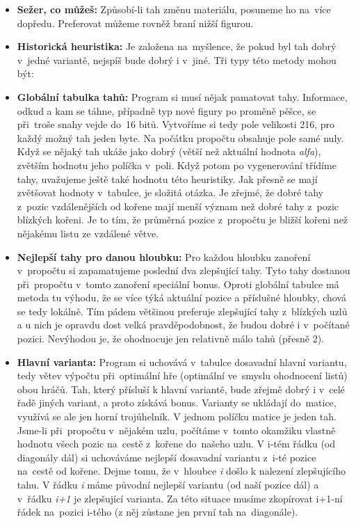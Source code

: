 \documentclass[11pt, titlepage]{article}
\begin{document}
\begin{itemize}
	\item {\bf Sežer, co můžeš:} Způsobí-li tah změnu materiálu, posuneme ho na~více dopředu. Preferovat můžeme rovněž braní nižší figurou.
	\item {\bf Historická heuristika:} Je založena na~myšlence, že pokud byl tah dobrý v~jedné variantě, nejspíš bude dobrý i v~jiné. Tři typy této metody mohou být:
	\item {\bf Globální tabulka tahů:} Program si musí nějak pamatovat tahy. Informace, odkud a kam se táhne, případně typ nové figury po proměně pěšce, se při~troše snahy vejde do~16 bitů. Vytvoříme si tedy pole velikosti 216, pro každý možný tah jeden byte. Na počátku propočtu obsahuje pole samé nuly. Když se nějaký tah ukáže jako dobrý (větší než aktuální hodnota {\it alfa}), zvětším hodnotu jeho políčka v~poli. Když potom po vygenerování třídíme tahy, uvažujeme ještě také hodnotu této heuristiky. Jak přesně se mají zvětšovat hodnoty v~tabulce, je složitá otázka. Je zřejmé, že dobré tahy z~pozic vzdálenějších od kořene mají menší význam než dobré tahy z~pozic blízkých kořeni. Je to tím, že průměrná pozice z~propočtu je bližší kořeni než nějakému listu ze vzdálené větve.
	\item {\bf Nejlepší tahy pro danou hloubku:} Pro každou hloubku zanoření v~propočtu si zapamatujeme poslední dva zlepšující tahy. Tyto tahy dostanou při~propočtu v~tomto zanoření speciální bonus. Oproti globální tabulce má metoda tu výhodu, že se více týká aktuální pozice a příslušné hloubky, chová se tedy lokálně. Tím pádem většinou preferuje zlepšující tahy z~blízkých uzlů a u nich je opravdu dost velká pravděpodobnost, že budou dobré i v~počítané pozici. Nevýhodou je, že ohodnocuje jen relativně málo tahů (přesně 2).
	\item {\bf Hlavní varianta:} Program si uchovává v~tabulce dosavadní hlavní variantu, tedy větev výpočtu při~optimální hře (optimální ve~smyslu ohodnocení listů) obou hráčů. Tah, který přísluší k hlavní variantě, bude zřejmě dobrý i v~celé řadě jiných variant, a proto získává bonus. Varianty se ukládají do~matice, využívá se ale jen horní trojúhelník. V jednom políčku matice je jeden tah. Jsme-li při~propočtu v~nějakém uzlu, počítáme v~tomto okamžiku vlastně hodnotu všech pozic na~cestě z~kořene do~našeho uzlu. V i-tém řádku (od diagonály dál) si uchováváme nejlepší dosavadní variantu z~i-té pozice na~cestě od kořene. Dejme tomu, že v~hloubce {\it i} došlo k nalezení zlepšujícího tahu. V řádku {\it i} máme původní nejlepší variantu (od naší pozice dál) a v~řádku {\it i+1} je zlepšující varianta. Za této situace musíme zkopírovat i+1-ní řádek na~pozici i-tého (z něj zůstane jen první tah na~diagonále).
\end{itemize}
\end{document}
